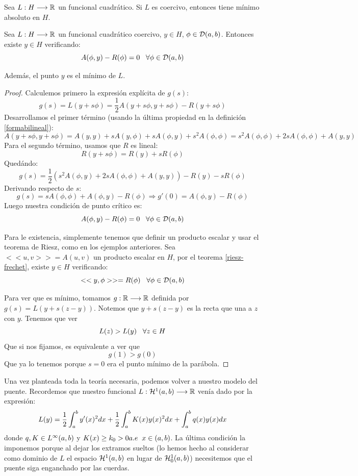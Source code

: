 \begin{theorem}
Sea $L : H \longrightarrow \mathbb{R}$ un funcional cuadrático. Si $L$ es coercivo, entonces tiene mínimo absoluto en $H$.
\end{theorem}

\begin{prop}
Sea $L : H \longrightarrow \mathbb{R}$ un funcional cuadrático coercivo, $y\in H$, $\phi\in\mathcal{D}(a,b)$. Entonces existe $y\in H$ verificando:
\[
A(\phi,y)-R(\phi)=0 \;\;\; \forall\phi\in\mathcal{D}(a,b)
\]

Además, el punto $y$ es el mínimo de $L$.
\end{prop}
\begin{proof}
Calculemos primero la expresión explícita de $g(s)$:
\[
g(s)=L(y+s\phi)=\frac{1}{2}A(y+s\phi,y+s\phi)-R(y+s\phi)
\]
Desarrollamos el primer término (usando la última propiedad en la definición \ref{formabilineal}):
\[
A(y+s\phi,y+s\phi)=A(y,y)+sA(y,\phi)+sA(\phi,y)+s^2A(\phi,\phi)=s^2A(\phi,\phi)+2sA(\phi,\phi)+A(y,y)
\]
Para el segundo término, usamos que $R$ es lineal:
\[
R(y+s\phi)=R(y)+sR(\phi)
\]
Quedándo:
\[
g(s)=\frac{1}{2}\left(s^2A(\phi,y)+2sA(\phi,\phi)+A(y,y)\right)-R(y)-sR(\phi)
\]
Derivando respecto de $s$:
\[
g(s)=sA(\phi,\phi)+A(\phi,y)-R(\phi) \Rightarrow g'(0)=A(\phi,y)-R(\phi)
\]
Luego nuestra condición de punto crítico es:
\[
A(\phi,y)-R(\phi)=0 \;\;\; \forall\phi\in\mathcal{D}(a,b)
\]

Para le existencia, simplemente tenemos que definir un producto escalar y usar el teorema de Riesz, como en los ejemplos anteriores. Sea $<<u,v>>=A(u,v)$ un producto escalar en $H$, por el teorema \ref{riesz-frechet}, existe $y\in H$ verificando:
\[
<<y,\phi>>=R(\phi) \;\;\; \forall \phi\in\mathcal{D}(a,b)
\]

Para ver que es mínimo, tomamos $g : \mathbb{R} \longrightarrow \mathbb{R}$ definida por $g(s)=L(y+s(z-y))$. Notemos que $y+s(z-y)$ es la recta que una a $z$ con $y$. Tenemos que ver
\[
L(z)>L(y) \;\;\; \forall z\in H
\]
Que si nos fijamos, es equivalente a ver que
\[
g(1)>g(0)
\]
Que ya lo tenemos porque $s=0$ era el punto mínimo de la parábola.
\end{proof}

Una vez planteada toda la teoría necesaria, podemos volver a nuestro modelo del puente. Recordemos que nuestro funcional  $L : \mathcal{H}^{ 1 } (a,b) \longrightarrow \mathbb{R}$ venía dado por la expresión:
\[
L(y)=\frac{1}{2}\displaystyle\int_{ a }^{ b } y'(x)^2dx+\frac{1}{2}\displaystyle\int_{ a }^{ b } K(x)y(x)^2dx+\displaystyle\int_{ a }^{ b } q(x)y(x)dx
\]
donde $q,K\in L^{ \infty }(a,b)$ y $K(x)\geq k_0 >0a.e \;\; x\in(a,b)$. La última condición la imponemos porque al dejar los extramos sueltos (lo hemos hecho al considerar como dominio de $L$ el espacio $\mathcal{H}^{ 1 } (a,b)$ en lugar de $\mathcal{H}_0^{ 1 } (a,b)$) necesitemos que el puente siga enganchado por las cuerdas.

